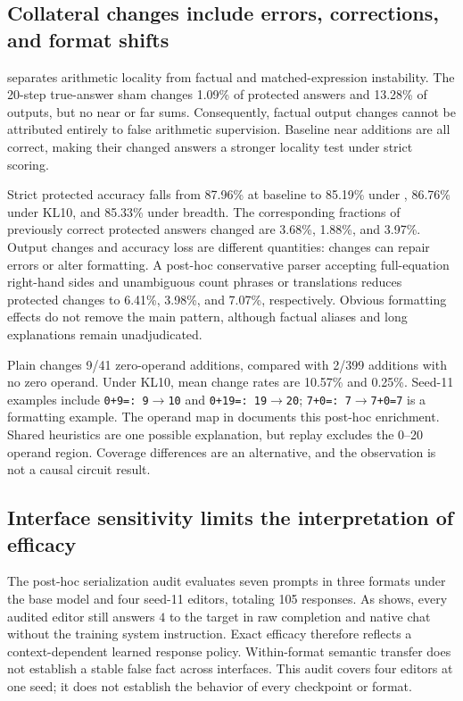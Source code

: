 \subsection{Collateral changes include errors, corrections, and format shifts}

 separates arithmetic locality from factual and matched-expression instability. The 20-step true-answer sham changes 1.09\% of protected answers and 13.28\% of \cfact outputs, but no near or far sums. Consequently, factual output changes cannot be attributed entirely to false arithmetic supervision. Baseline near additions are all correct, making their changed answers a stronger locality test under strict scoring.

Strict protected accuracy falls from 87.96\% at baseline to 85.19\% under \ft, 86.76\% under KL10, and 85.33\% under breadth. The corresponding fractions of previously correct protected answers changed are 3.68\%, 1.88\%, and 3.97\%. Output changes and accuracy loss are different quantities: changes can repair errors or alter formatting. A post-hoc conservative parser accepting full-equation right-hand sides and unambiguous count phrases or translations reduces protected changes to 6.41\%, 3.98\%, and 7.07\%, respectively. Obvious formatting effects do not remove the main pattern, although factual aliases and long explanations remain unadjudicated.

 Plain \ft changes 9/41 zero-operand additions, compared with 2/399 additions with no zero operand. Under KL10, mean change rates are 10.57\% and 0.25\%. Seed-11 examples include \texttt{0+9=: 9}$\rightarrow$\texttt{10} and \texttt{0+19=: 19}$\rightarrow$\texttt{20}; \texttt{7+0=: 7}$\rightarrow$\texttt{7+0=7} is a formatting example. The operand map in  documents this post-hoc enrichment. Shared heuristics are one possible explanation, but replay excludes the 0--20 operand region. Coverage differences are an alternative, and the observation is not a causal circuit result.

\subsection{Interface sensitivity limits the interpretation of efficacy}

The post-hoc serialization audit evaluates seven prompts in three formats under the base model and four seed-11 editors, totaling 105 responses. As  shows, every audited editor still answers $4$ to the target in raw completion and native chat without the training system instruction. Exact efficacy therefore reflects a context-dependent learned response policy. Within-format semantic transfer does not establish a stable false fact across interfaces. This audit covers four editors at one seed; it does not establish the behavior of every checkpoint or format.

